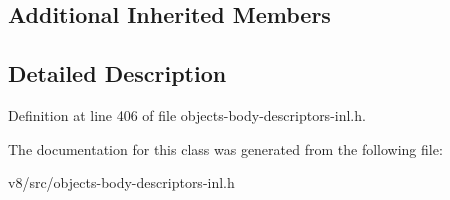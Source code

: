 \subsection*{Additional Inherited Members}


\subsection{Detailed Description}


Definition at line 406 of file objects-\/body-\/descriptors-\/inl.\+h.



The documentation for this class was generated from the following file\+:\begin{DoxyCompactItemize}
\item 
v8/src/objects-\/body-\/descriptors-\/inl.\+h\end{DoxyCompactItemize}
